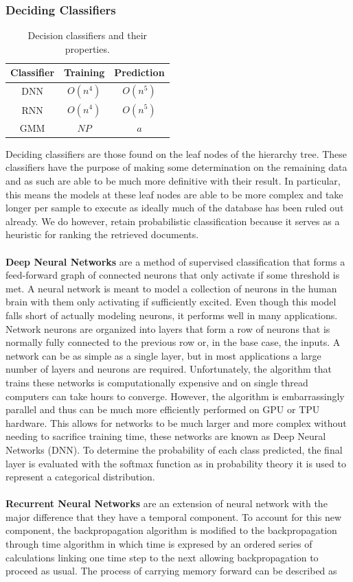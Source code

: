 \subsubsection{Deciding Classifiers}
\begin{table}[h]
    \begin{tabular}{c|cc}
        Classifier & Training & Prediction \\ \hline
        DNN & $O(n^4)$ & $O(n^5)$ \\
        RNN & $O(n^4)$ & $O(n^5)$ \\
        GMM & $NP$ & $a$
    \end{tabular}
    \caption{Decision classifiers and their properties.}
    \label{tab:dec-class}
\end{table}
Deciding classifiers are those found on the leaf nodes of the hierarchy tree. These classifiers have the purpose of making some determination on the remaining data and as such are able to be much more definitive with their result. In particular, this means the models at these leaf nodes are able to be more complex and take longer per sample to execute as ideally much of the database has been ruled out already. We do however, retain probabilistic classification because it serves as a heuristic for ranking the retrieved documents.
\\
\\
\textbf{Deep Neural Networks} are a method of supervised classification that forms a feed-forward graph of connected neurons that only activate if some threshold is met. A neural network is meant to model a collection of neurons in the human brain with them only activating if sufficiently excited. Even though this model falls short of actually modeling neurons, it performs well in many applications. Network neurons are organized into layers that form a row of neurons that is normally fully connected to the previous row or, in the base case, the inputs. A network can be as simple as a single layer, but in most applications a large number of layers and neurons are required. Unfortunately, the algorithm that trains these networks is computationally expensive and on single thread computers can take hours to converge. However, the algorithm is embarrassingly parallel and thus can be much more efficiently performed on GPU or TPU hardware. This allows for networks to be much larger and more complex without needing to sacrifice training time, these networks are known as Deep Neural Networks (DNN). To determine the probability of each class predicted, the final layer is evaluated with the softmax function as in probability theory it is used to represent a categorical distribution.
\\
\\
\textbf{Recurrent Neural Networks} are an extension of neural network with the major difference that they have a temporal component. To account for this new component, the backpropagation algorithm is modified to the backpropagation through time algorithm in which time is expresed by an ordered series of calculations linking one time step to the next allowing backpropagation to proceed as usual. The process of carrying memory forward can be described as

